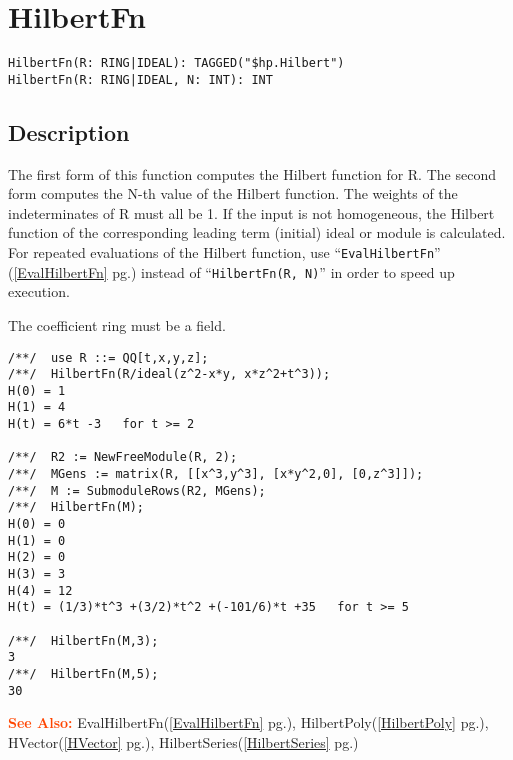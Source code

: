 \documentclass[a4paper]{mybook}
\newenvironment{command}{}{} %
\newcommand\SeeAlso{\par\textcolor{OrangeRed}{\textbf{\large See Also: }}}
\begin{document}
\section{HilbertFn}
\label{HilbertFn}
\begin{command} %


\begin{Verbatim}[label=syntax, rulecolor=\color{MidnightBlue},
frame=single]
HilbertFn(R: RING|IDEAL): TAGGED("$hp.Hilbert")
HilbertFn(R: RING|IDEAL, N: INT): INT
\end{Verbatim}


\subsection*{Description}

The first form of this function computes the Hilbert function for R.
The second form computes the N-th value of the Hilbert function.  The
weights of the indeterminates of R must all be 1.  If the input is not
homogeneous, the Hilbert function of the corresponding leading term
(initial) ideal or module is calculated.  For repeated evaluations of
the Hilbert function, use ``\verb&EvalHilbertFn&'' (\ref{EvalHilbertFn} pg.\pageref{EvalHilbertFn}) instead
of ``\verb&HilbertFn(R, N)&'' in order to speed up execution.
\par 
The coefficient ring must be a field.
\begin{Verbatim}[label=example, rulecolor=\color{PineGreen}, frame=single]
/**/  use R ::= QQ[t,x,y,z];
/**/  HilbertFn(R/ideal(z^2-x*y, x*z^2+t^3));
H(0) = 1
H(1) = 4
H(t) = 6*t -3   for t >= 2

/**/  R2 := NewFreeModule(R, 2);
/**/  MGens := matrix(R, [[x^3,y^3], [x*y^2,0], [0,z^3]]);
/**/  M := SubmoduleRows(R2, MGens);
/**/  HilbertFn(M);
H(0) = 0
H(1) = 0
H(2) = 0
H(3) = 3
H(4) = 12
H(t) = (1/3)*t^3 +(3/2)*t^2 +(-101/6)*t +35   for t >= 5

/**/  HilbertFn(M,3);
3
/**/  HilbertFn(M,5);
30
\end{Verbatim}


\SeeAlso %
  EvalHilbertFn(\ref{EvalHilbertFn} pg.\pageref{EvalHilbertFn}), 
    HilbertPoly(\ref{HilbertPoly} pg.\pageref{HilbertPoly}), 
    HVector(\ref{HVector} pg.\pageref{HVector}), 
    HilbertSeries(\ref{HilbertSeries} pg.\pageref{HilbertSeries})
\end{command} %
\end{document}
